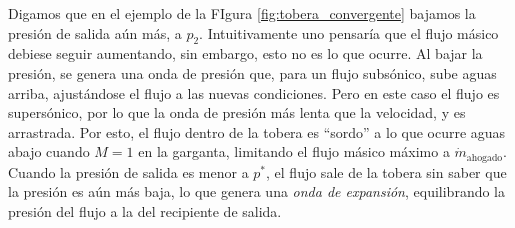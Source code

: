 Digamos que en el ejemplo de la FIgura \ref{fig:tobera_convergente} bajamos la presión de salida aún más, a $p_2$.
Intuitivamente uno pensaría que el flujo másico debiese seguir aumentando, sin embargo, esto no es lo que ocurre.
Al bajar la presión, se genera una onda de presión que, para un flujo subsónico, sube aguas arriba, ajustándose el flujo a las nuevas condiciones.
Pero en este caso el flujo es supersónico, por lo que la onda de presión más lenta que la velocidad, y es arrastrada.
Por esto, el flujo dentro de la tobera es ``sordo'' a lo que ocurre aguas abajo cuando $M=1$ en la garganta, limitando el flujo másico máximo a $\dot{m}_\text{ahogado}$.
Cuando la presión de salida es menor a $p^*$, el flujo sale de la tobera sin saber que la presión es aún más baja, lo que genera una \emph{onda de expansión}, equilibrando la presión del flujo a la del recipiente de salida.
